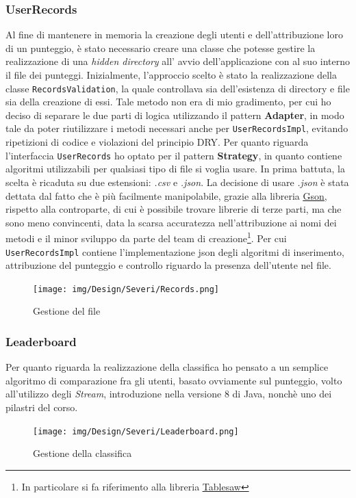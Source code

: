 \documentclass[a4paper,12pt]{report}
\begin{document}
\subsubsection{UserRecords}
Al fine di mantenere in memoria la creazione degli utenti e dell'attribuzione loro di un punteggio, è stato necessario creare una classe che potesse gestire la realizzazione di una \textit{hidden directory} all' avvio dell'applicazione con al suo interno il file dei punteggi. Inizialmente, l'approccio scelto è stato la realizzazione della classe \texttt{RecordsValidation}, la quale controllava sia dell'esistenza di directory e file sia della creazione di essi. Tale metodo non era di mio gradimento, per cui ho deciso di separare le due parti di logica utilizzando il pattern \textbf{Adapter}, in modo tale da poter riutilizzare i metodi necessari anche per \texttt{UserRecordsImpl}, evitando ripetizioni di codice e violazioni del principio DRY. Per quanto riguarda l'interfaccia \texttt{UserRecords} ho optato per il pattern \textbf{Strategy}, in quanto contiene algoritmi utilizzabili per qualsiasi tipo di file si voglia usare. In prima battuta, la scelta è ricaduta su due estensioni: \textit{.csv} e \textit{.json}. La decisione di usare \textit{.json} è stata dettata dal fatto che è più facilmente manipolabile, grazie alla libreria \href{https://github.com/google/gson}{\underline{Gson}}, rispetto alla controparte, di cui è possibile trovare librerie di terze parti, ma che sono meno convincenti, data la scarsa accuratezza nell'attribuzione ai nomi dei metodi e il minor sviluppo da parte del team di creazione\footnote{In particolare si fa riferimento alla libreria \href{https://github.com/jtablesaw/tablesaw}{\underline{Tablesaw}}}. Per cui \texttt{UserRecordsImpl} contiene l'implementazione json degli algoritmi di inserimento, attribuzione del punteggio e controllo riguardo la presenza dell'utente nel file.
\begin{figure}[H]
    \begin{center}
        \centering
        \texttt{[image: img/Design/Severi/Records.png]}
    \end{center}
    \caption{Gestione del file}
    \label{img:records}
\end{figure}

\subsubsection{Leaderboard}
Per quanto riguarda la realizzazione della classifica ho pensato a un semplice algoritmo di comparazione fra gli utenti, basato ovviamente sul punteggio, volto all'utilizzo degli \textit{Stream}, introduzione nella versione 8 di Java, nonchè uno dei pilastri del corso. 
\begin{figure}[H]
    \begin{center}
        \centering
        \texttt{[image: img/Design/Severi/Leaderboard.png]}
    \end{center}
    \caption{Gestione della classifica}
    \label{img:leaderboard}
\end{figure}
\end{document}
